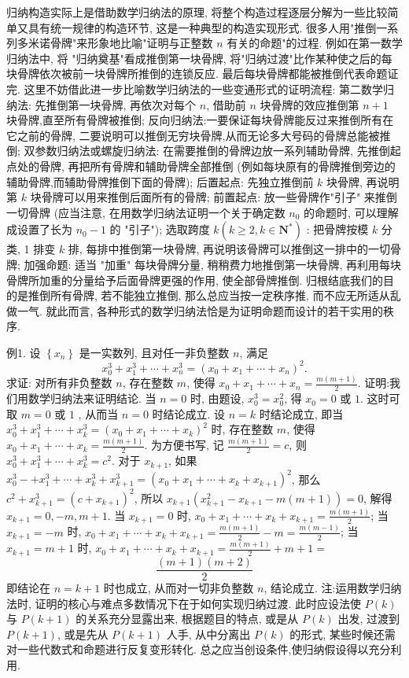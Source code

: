 归纳构造实际上是借助数学归纳法的原理, 将整个构造过程逐层分解为一些比较简单又具有统一规律的构造环节, 这是一种典型的构造实现形式.
很多人用"推倒一系列多米诺骨牌"来形象地比喻"证明与正整数 $n$ 有关的命题"的过程.
例如在第一数学归纳法中, 将 "归纳奠基"看成推倒第一块骨牌, 将"归纳过渡"比作某种使之后的每块骨牌依次被前一块骨牌所推倒的连锁反应.
最后每块骨牌都能被推倒代表命题证完.
这里不妨借此进一步比喻数学归纳法的一些变通形式的证明流程:
第二数学归纳法: 先推倒第一块骨牌, 再依次对每个 $n$, 借助前 $n$ 块骨牌的效应推倒第 $n+1$ 块骨牌,直至所有骨牌被推倒;
反向归纳法:一要保证每块骨牌能反过来推倒所有在它之前的骨牌, 二要说明可以推倒无穷块骨牌,从而无论多大号码的骨牌总能被推倒;
双参数归纳法或螺旋归纳法: 在需要推倒的骨牌边放一系列辅助骨牌, 先推倒起点处的骨牌, 再把所有骨牌和辅助骨牌全部推倒 (例如每块原有的骨牌推倒旁边的辅助骨牌,而辅助骨牌推倒下面的骨牌);
后置起点: 先独立推倒前 $k$ 块骨牌, 再说明第 $k$ 块骨牌可以用来推倒后面所有的骨牌;
前置起点: 放一些骨牌作"引子" 来推倒一切骨牌 (应当注意, 在用数学归纳法证明一个关于确定数 $n_0$ 的命题时, 可以理解成设置了长为 $n_0-1$ 的 "引子");
选取跨度 $k\left(k \geqslant 2, k \in \mathbf{N}^*\right)$ : 把骨牌按模 $k$ 分类, 1 排变 $k$ 排, 每排中推倒第一块骨牌, 再说明该骨牌可以推倒这一排中的一切骨牌;
加强命题: 适当 "加重" 每块骨牌分量, 稍稍费力地推倒第一块骨牌, 再利用每块骨牌所加重的分量给予后面骨牌更强的作用, 使全部骨牌推倒.
归根结底我们的目的是推倒所有骨牌, 若不能独立推倒, 那么总应当按一定秩序推, 而不应无所适从乱做一气.
就此而言, 各种形式的数学归纳法恰是为证明命题而设计的若干实用的秩序.



例1. 设 $\left\{x_n\right\}$ 是一实数列, 且对任一非负整数 $n$, 满足
$$
x_0^3+x_1^3+\cdots+x_n^3=\left(x_0+x_1+\cdots+x_n\right)^2 .
$$
求证: 对所有非负整数 $n$, 存在整数 $m$, 使得 $x_0+x_1+\cdots+x_n= \frac{m(m+1)}{2}$.
证明:我们用数学归纳法来证明结论.
当 $n=0$ 时, 由题设, $x_0^3=x_0^2$, 得 $x_0=0$ 或 $1$. 这时可取 $m=0$ 或 $1$ , 从而当 $n=0$ 时结论成立.
设 $n=k$ 时结论成立, 即当 $x_0^3+x_1^3+\cdots+x_k^3=\left(x_0+x_1+\cdots+x_k\right)^2$ 时, 存在整数 $m$, 使得 $x_0+x_1+\cdots+x_k=\frac{m(m+1)}{2}$.
为方便书写, 记 $\frac{m(m+1)}{2}=c$, 则 $x_0^3+x_1^3+\cdots+x_k^3=c^2$.
对于 $x_{k+1}$, 如果 $x_0^3-+x_1^3+\cdots+x_k^3+x_{k+1}^3=\left(x_0+x_1+\cdots+x_k+x_{k+1}\right)^2$, 那么 $c^2+x_{k+1}^3=\left(c+x_{k+1}\right)^2$, 所以 $x_{k+1}\left(x_{k+1}^2-x_{k+1}-m(m+1)\right)=0$, 解得 $x_{k+1}=0,-m, m+1$.
当 $x_{k+1}=0$ 时, $x_0+x_1+\cdots+x_k+x_{k+1}=\frac{m(m+1)}{2}$;
当 $x_{k+1}=-m$ 时, $x_0+x_1+\cdots+x_k+x_{k+1}=\frac{m(m+1)}{2}-m=\frac{m(m-1)}{2}$;
当 $x_{k+1}=m+1$ 时, $x_0+x_1+\cdots+x_k+x_{k+1}=\frac{m(m+1)}{2}+m+1=$
$$
\frac{(m+1)(m+2)}{2}
$$
即结论在 $n=k+1$ 时也成立, 从而对一切非负整数 $n$, 结论成立.
注:运用数学归纳法时, 证明的核心与难点多数情况下在于如何实现归纳过渡.
此时应设法使 $P(k)$ 与 $P(k+1)$ 的关系充分显露出来, 根据题目的特点, 或是从 $P(k)$ 出发, 过渡到 $P(k+1)$, 或是先从 $P(k+1)$ 人手, 从中分离出 $P(k)$ 的形式, 某些时候还需对一些代数式和命题进行反复变形转化.
总之应当创设条件,使归纳假设得以充分利用.



